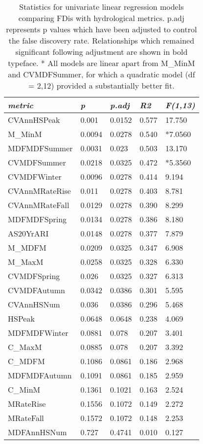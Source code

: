 \documentclass[openright,12pt,a4paper]{memoir}
\begin{document}
\doublespacing


\begin{table}[ht]
\tiny
\centering
\caption[Statistics for univariate linear regression models.]{\small{Statistics for univariate linear regression models comparing FDis with hydrological metrics. p.adj represents p values which have been adjusted to control the false discovery rate. Relationships which remained significant following adjustment are shown in bold typeface. * All models are linear apart from M\_MinM and CVMDFSummer, for which a quadratic model (df = 2,12) provided a substantially better fit.}} \\
\label{Ch3sup3_T1} \\
{\tabulinesep=1.2mm
\begin{tabu} to 
\hline
\textit{metric} & \textit{p} & \textit{p.adj} & \textit{R2} & \textit{F(1,13)} \\
\hline
CVAnnHSPeak & 0.001 & 0.0152 & 0.577 & 17.750 \\
M\_MinM & 0.0094 & 0.0278 & 0.540 & *7.0560 \\
MDFMDFSummer & 0.0031 & 0.023 & 0.503 & 13.170 \\
CVMDFSummer & 0.0218 & 0.0325 & 0.472 & *5.3560 \\
CVMDFWinter & 0.0096 & 0.0278 & 0.414 & 9.194 \\
CVAnnMRateRise & 0.011 & 0.0278 & 0.403 & 8.781 \\
CVAnnMRateFall & 0.0129 & 0.0278 & 0.390 & 8.299 \\
MDFMDFSpring & 0.0134 & 0.0278 & 0.386 & 8.180 \\
AS20YrARI & 0.0148 & 0.0278 & 0.377 & 7.879 \\
M\_MDFM & 0.0209 & 0.0325 & 0.347 & 6.908 \\
M\_MaxM & 0.0258 & 0.0325 & 0.328 & 6.330 \\
CVMDFSpring & 0.026 & 0.0325 & 0.327 & 6.313 \\
CVMDFAutumn & 0.0342 & 0.0386 & 0.301 & 5.595 \\
CVAnnHSNum & 0.036 & 0.0386 & 0.296 & 5.468 \\
HSPeak & 0.0648 & 0.0648 & 0.238 & 4.069 \\
MDFMDFWinter & 0.0881 & 0.078 & 0.207 & 3.401 \\
C\_MaxM & 0.0885 & 0.078 & 0.207 & 3.392 \\
C\_MDFM & 0.1086 & 0.0861 & 0.186 & 2.968 \\
MDFMDFAutumn & 0.1091 & 0.0861 & 0.185 & 2.959 \\
C\_MinM & 0.1361 & 0.1021 & 0.163 & 2.524 \\
MRateRise & 0.1556 & 0.1072 & 0.149 & 2.272 \\
MRateFall & 0.1572 & 0.1072 & 0.148 & 2.253 \\
MDFAnnHSNum & 0.727 & 0.4741 & 0.010 & 0.127 \\
\hline
\end{tabu}}
\end{table}

\clearpage
\end{document}
